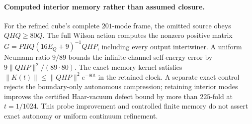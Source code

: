 \paragraph{Computed interior memory rather than assumed closure.}
For the refined cube's complete $201$-mode frame, the omitted source obeys
$QHQ\ge80Q$. The full Wilson action computes the nonzero positive matrix
$G=PHQ(16E_Q+9)^{-1}QHP$, including every output intertwiner. A uniform
Neumann ratio $9/89$ bounds the infinite-channel self-energy error by
$9\lVert QHP\rVert^2/(89\cdot80)$. The exact memory kernel satisfies
$\lVert K(t)\rVert\le\lVert QHP\rVert^2e^{-80t}$ in the retained clock.
A separate exact control rejects the boundary-only autonomous compression;
retaining interior modes improves the certified Haar-vacuum defect bound by
more than $225$-fold at $t=1/1024$. This probe improvement and controlled
finite memory do not assert exact autonomy or uniform continuum refinement.
